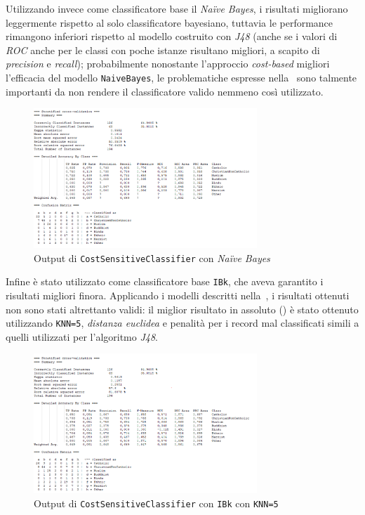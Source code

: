 \documentclass[a4paper,11pt,twoside,notitlepage,final]{scrartcl}
\begin{document}
Utilizzando invece come classificatore base il \emph{Naïve Bayes}, i risultati migliorano leggermente rispetto al solo classificatore bayesiano, tuttavia le performance rimangono inferiori rispetto al modello costruito con \emph{J48} (anche se i valori di \emph{ROC} anche per le classi con poche istanze risultano migliori, a scapito di \emph{precision} e \emph{recall});
probabilmente nonostante l'approccio \emph{cost-based} migliori l'efficacia del modello \texttt{NaiveBayes}, le problematiche espresse nella~ sono talmente importanti da non rendere il classificatore valido nemmeno così utilizzato.

\begin{figure}[H]
  \centering
  \includegraphics[width=0.75\textwidth]{fig/MultiBayes.PNG}%
  \caption{Output di \texttt{CostSensitiveClassifier} con \emph{Naïve Bayes}}%
  \label{fig:cost:j48}
\end{figure}

Infine è stato utilizzato come classificatore base \texttt{IBk}, che aveva garantito i risultati migliori finora.
Applicando i modelli descritti nella~, i risultati ottenuti non sono stati altrettanto validi:
il miglior risultato in assoluto () è stato ottenuto utilizzando \texttt{KNN=5}, \emph{distanza euclidea} e penalità per i record mal classificati simili a quelli utilizzati per l'algoritmo \emph{J48}.

\begin{figure}[H]
  \centering
  \includegraphics[width=0.75\textwidth]{fig/kNNWeighted.PNG}%
  \caption{Output di \texttt{CostSensitiveClassifier} con \texttt{IBk} con \texttt{KNN=5}}%
  \label{fig:cost:ibk5}
\end{figure}
\end{document}
